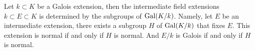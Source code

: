 \begin{prop}
    Let $k\subset K$ be a Galois extension, then the intermediate field extensions $k\subset E\subset K$ is determined by the subgroups of $\text{Gal}(K/k)$. Namely, let $E$ be an intermediate extension, there exists a subgroup $H$ of $\text{Gal}(K/k)$ that fixes $E$. This extension is normal if and only if $H$ is normal. And $E/k$ is Galois if and only if $H$ is normal.
\end{prop}


        
        
        
        
    





